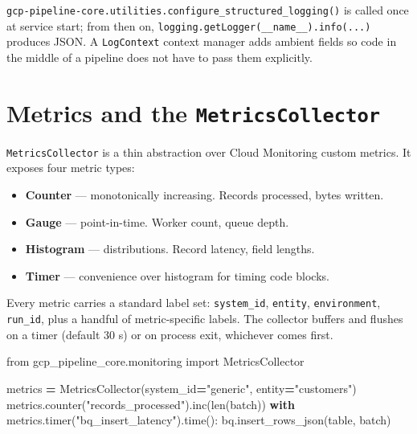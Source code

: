 \documentclass[
  11pt,
  british,
  oneside]{book}
\newenvironment{Shaded}{\begin{snugshade}}{\end{snugshade}}
\newcommand{\BuiltInTok}[1]{#1}
\newcommand{\ControlFlowTok}[1]{\textcolor[rgb]{0.13,0.29,0.53}{\textbf{#1}}}
\newcommand{\ImportTok}[1]{#1}
\newcommand{\NormalTok}[1]{#1}
\newcommand{\OperatorTok}[1]{\textcolor[rgb]{0.81,0.36,0.00}{\textbf{#1}}}
\newcommand{\StringTok}[1]{\textcolor[rgb]{0.31,0.60,0.02}{#1}}
\providecommand{\tightlist}{%
  \setlength{\itemsep}{0pt}\setlength{\parskip}{0pt}}
\begin{document}
\texttt{gcp-pipeline-core.utilities.configure\_structured\_logging()} is
called once at service start; from then on,
\texttt{logging.getLogger(\_\_name\_\_).info(...)} produces JSON. A
\texttt{LogContext} context manager adds ambient fields so code in the
middle of a pipeline does not have to pass them explicitly.

\hypertarget{metrics-and-the-metricscollector}{%
\section{\texorpdfstring{Metrics and the
\texttt{MetricsCollector}}{Metrics and the MetricsCollector}}\label{metrics-and-the-metricscollector}}

\texttt{MetricsCollector} is a thin abstraction over Cloud Monitoring
custom metrics. It exposes four metric types:

\begin{itemize}
\tightlist
\item
  \textbf{Counter} --- monotonically increasing. Records processed,
  bytes written.
\item
  \textbf{Gauge} --- point-in-time. Worker count, queue depth.
\item
  \textbf{Histogram} --- distributions. Record latency, field lengths.
\item
  \textbf{Timer} --- convenience over histogram for timing code blocks.
\end{itemize}

Every metric carries a standard label set: \texttt{system\_id},
\texttt{entity}, \texttt{environment}, \texttt{run\_id}, plus a handful
of metric-specific labels. The collector buffers and flushes on a timer
(default 30 s) or on process exit, whichever comes first.

\begin{Shaded}
\begin{Highlighting}[]
\ImportTok{from}\NormalTok{ gcp\_pipeline\_core.monitoring }\ImportTok{import}\NormalTok{ MetricsCollector}

\NormalTok{metrics }\OperatorTok{=}\NormalTok{ MetricsCollector(system\_id}\OperatorTok{=}\StringTok{"generic"}\NormalTok{, entity}\OperatorTok{=}\StringTok{"customers"}\NormalTok{)}
\NormalTok{metrics.counter(}\StringTok{"records\_processed"}\NormalTok{).inc(}\BuiltInTok{len}\NormalTok{(batch))}
\ControlFlowTok{with}\NormalTok{ metrics.timer(}\StringTok{"bq\_insert\_latency"}\NormalTok{).time():}
\NormalTok{    bq.insert\_rows\_json(table, batch)}
\end{Highlighting}
\end{Shaded}
\end{document}
